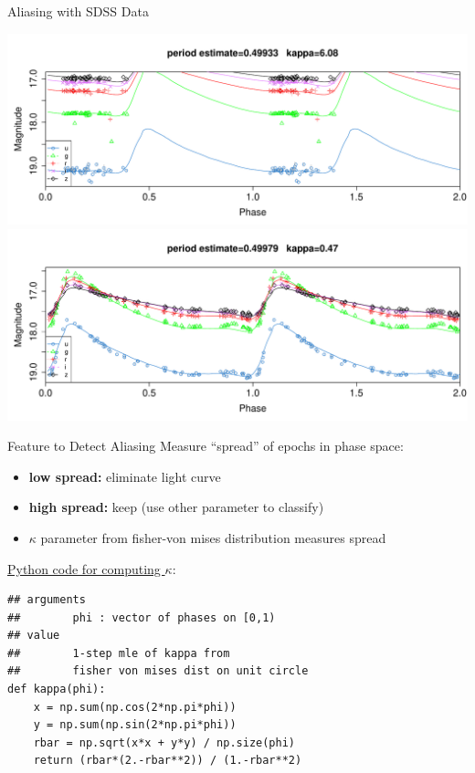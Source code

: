 \documentclass[12pt]{beamer}
\begin{document}
\begin{frame}{Aliasing with SDSS Data}

  \begin{center}
  \includegraphics[scale=0.3]{figs/alias_not_rr.pdf}\\
  \includegraphics[scale=0.3]{figs/alias_rr_rr.pdf}
  \end{center}
  
\end{frame}




\begin{frame}[fragile]{Feature to Detect Aliasing}
Measure ``spread'' of epochs in phase space:
    \begin{itemize}
    \item \textbf{low spread:} eliminate light curve
    \item \textbf{high spread:} keep (use other parameter to classify)
    \item $\kappa$ parameter from fisher-von mises distribution measures spread
  \end{itemize}

\vspace{.1in}
    
\underline{Python code for computing $\kappa$}:
\begin{verbatim}
## arguments
##        phi : vector of phases on [0,1)
## value
##        1-step mle of kappa from
##        fisher von mises dist on unit circle
def kappa(phi):
    x = np.sum(np.cos(2*np.pi*phi))
    y = np.sum(np.sin(2*np.pi*phi))
    rbar = np.sqrt(x*x + y*y) / np.size(phi)
    return (rbar*(2.-rbar**2)) / (1.-rbar**2)
\end{verbatim}

\end{frame}
\end{document}
